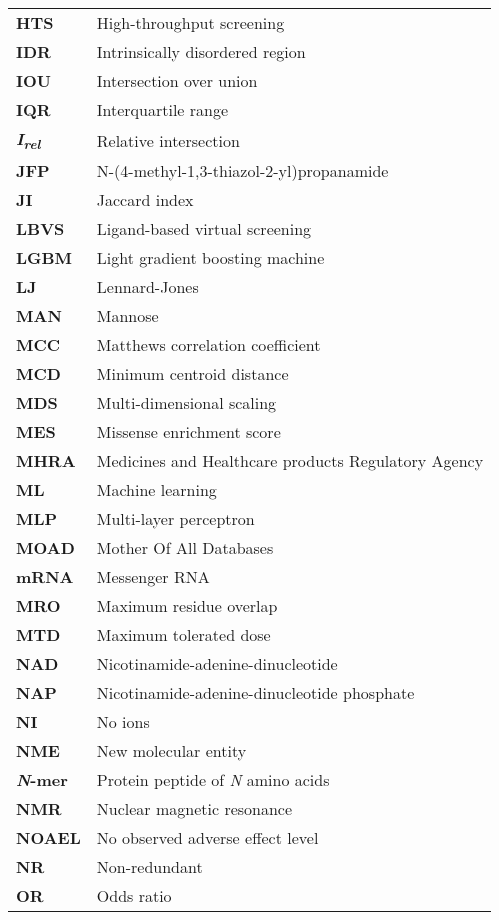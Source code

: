 \begin{longtable}[l]{@{}p{2.5cm}p{12cm}@{}}
\textbf{HTS} & High-throughput screening \\
\textbf{IDR} & Intrinsically disordered region \\
\textbf{IOU} & Intersection over union \\
\textbf{IQR} & Interquartile range \\
\textbf{\textit{I\textsubscript{rel}}} & Relative intersection \\
\textbf{JFP} & N-(4-methyl-1,3-thiazol-2-yl)propanamide \\
\textbf{JI} & Jaccard index \\
\textbf{LBVS} & Ligand-based virtual screening \\
\textbf{LGBM} & Light gradient boosting machine \\
\textbf{LJ} & Lennard-Jones \\
\textbf{MAN} & Mannose \\
\textbf{MCC} & Matthews correlation coefficient \\
\textbf{MCD} & Minimum centroid distance \\
\textbf{MDS} & Multi-dimensional scaling \\
\textbf{MES} & Missense enrichment score \\
\textbf{MHRA} & Medicines and Healthcare products Regulatory Agency \\
\textbf{ML} & Machine learning \\
\textbf{MLP} & Multi-layer perceptron \\
\textbf{MOAD} & Mother Of All Databases \\
\textbf{mRNA} & Messenger RNA \\
\textbf{MRO} & Maximum residue overlap \\
\textbf{MTD} & Maximum tolerated dose \\
\textbf{NAD} & Nicotinamide-adenine-dinucleotide \\
\textbf{NAP} & Nicotinamide-adenine-dinucleotide phosphate \\
\textbf{NI} & No ions \\
\textbf{NME} & New molecular entity \\
\textbf{\textit{N}-mer} & Protein peptide of \textit{N} amino acids \\
\textbf{NMR} & Nuclear magnetic resonance \\
\textbf{NOAEL} & No observed adverse effect level \\
\textbf{NR} & Non-redundant \\
\textbf{OR} & Odds ratio \\

\end{longtable}

